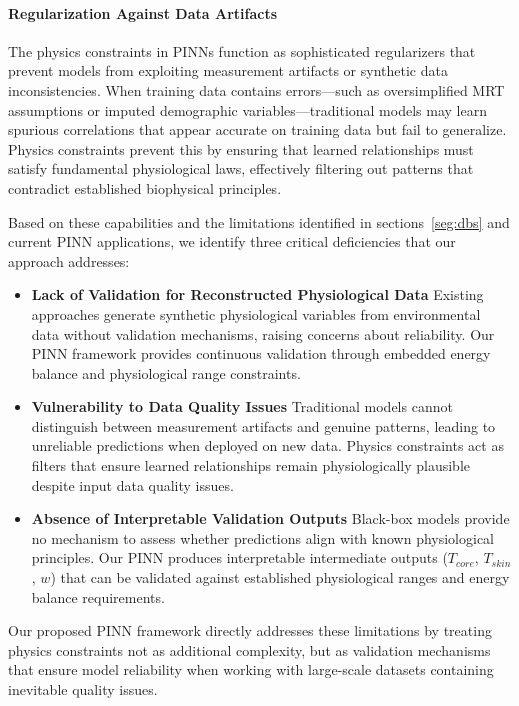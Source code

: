 \paragraph{Regularization Against Data Artifacts} The physics constraints in PINNs function as sophisticated regularizers that prevent models from exploiting measurement artifacts or synthetic data inconsistencies. When training data contains errors—such as oversimplified MRT assumptions or imputed demographic variables—traditional models may learn spurious correlations that appear accurate on training data but fail to generalize. Physics constraints prevent this by ensuring that learned relationships must satisfy fundamental physiological laws, effectively filtering out patterns that contradict established biophysical principles.

Based on these capabilities and the limitations identified in sections~\ref{seg:dbs} and current PINN applications, we identify three critical deficiencies that our approach addresses:

\begin{itemize}
\item \textbf{Lack of Validation for Reconstructed Physiological Data} Existing approaches generate synthetic physiological variables from environmental data without validation mechanisms, raising concerns about reliability. Our PINN framework provides continuous validation through embedded energy balance and physiological range constraints.

\item \textbf{Vulnerability to Data Quality Issues} Traditional models cannot distinguish between measurement artifacts and genuine patterns, leading to unreliable predictions when deployed on new data. Physics constraints act as filters that ensure learned relationships remain physiologically plausible despite input data quality issues.

\item \textbf{Absence of Interpretable Validation Outputs} Black-box models provide no mechanism to assess whether predictions align with known physiological principles. Our PINN produces interpretable intermediate outputs ($T_{core}$, $T_{skin}$, $w$) that can be validated against established physiological ranges and energy balance requirements.
\end{itemize}

Our proposed PINN framework directly addresses these limitations by treating physics constraints not as additional complexity, but as validation mechanisms that ensure model reliability when working with large-scale datasets containing inevitable quality issues.